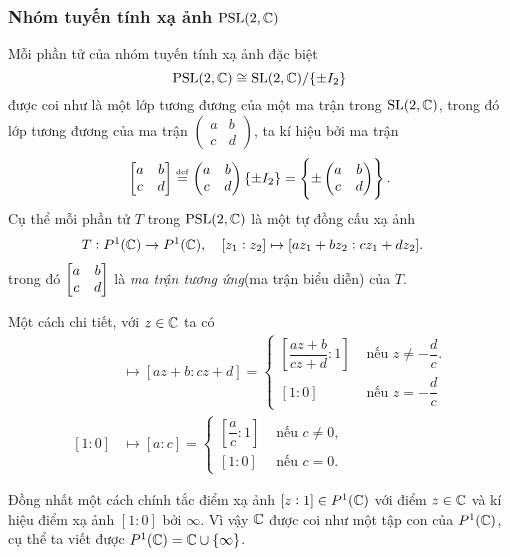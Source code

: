 \subsubsection{Nhóm tuyến tính xạ ảnh $\operatorname{PSL}(2,\mathbb{C})$}
\begin{defn}
    Mỗi phần tử của nhóm tuyến tính xạ ảnh đặc biệt
    \[\operatorname{PSL}(2,\mathbb{C}) \cong \operatorname{SL}(2,\mathbb{C}) /\{\pm I_2\}\]
    được coi như là một lớp tương đương của một ma trận trong $\operatorname{SL}(2,\mathbb{C})$, trong đó lớp tương đương của ma trận $\begin{pmatrix}
        a & b\\
        c & d
    \end{pmatrix}$, ta kí hiệu bởi ma trận
    \[\begin{bmatrix} a & b \\ c & d \\ \end{bmatrix} \overset{\underset{\mathrm{def}}{}}{=} \begin{pmatrix}
        a & b\\
        c & d
    \end{pmatrix}\{\pm I_2\} = \left\{\pm\begin{pmatrix}
        a & b\\
        c & d
    \end{pmatrix}\right\}.\]
    Cụ thể mỗi phần tử $T$ trong $\operatorname{PSL}(2,\mathbb{C})$ là một tự đồng cấu xạ ảnh 
    \begin{align*}
        T: P^1(\mathbb{C}) &\to P^1(\mathbb{C}),\quad [z_1:z_2] \mapsto [az_1+bz_2:cz_1+dz_2].
    \end{align*}
    trong đó $\begin{bmatrix} a & b \\ c & d \\ \end{bmatrix}$ là \textit{ma trận tương ứng}(ma trận biểu diễn) của $T$.
    
    Một cách chi tiết, với $z \in \mathbb{C}$ ta có
      \begin{align*}
      [z:1] &\mapsto [az+b:cz+d]=
      \begin{cases}
        \left[\dfrac{az+b}{cz+d}:1\right]   & \text{ nếu } z \neq -\dfrac{d}{c}.\\
        [1:0]  & \text{ nếu } z= -\dfrac{d}{c}
      \end{cases}\\
     [1:0] &\mapsto \left[a:c\right] = \begin{cases}
          \left[\dfrac{a}{c}:1\right]   & \text{ nếu } c \neq 0,\\
         [1:0]  & \text{ nếu }  c = 0.
      \end{cases}
      \end{align*}
\end{defn}

Đồng nhất một cách chính tắc điểm xạ ảnh $[z:1] \in P^1(\mathbb{C})$ với điểm $z \in \mathbb{C}$ và kí hiệu điểm xạ ảnh $[1:0]$ bởi $\infty$. Vì vậy $\mathbb{C}$ được coi như một tập con của $P^1(\mathbb{C})$, cụ thể ta viết được $P^1(\mathbb{C}) = \mathbb{C} \cup \{\infty\}$.

